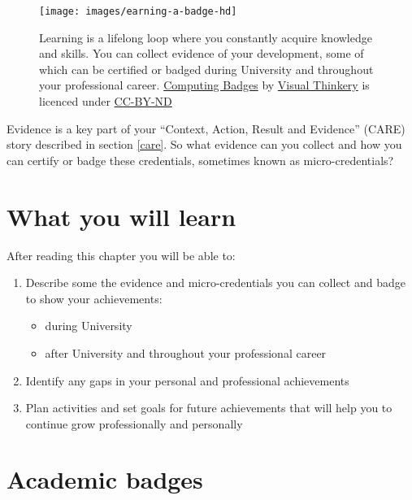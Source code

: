 \documentclass[
]{book}
\providecommand{\tightlist}{%
  \setlength{\itemsep}{0pt}\setlength{\parskip}{0pt}}
\begin{document}
\begin{figure}

{\centering \texttt{[image: images/earning-a-badge-hd]} 

}

\caption{Learning is a lifelong loop where you constantly acquire knowledge and skills. You can collect evidence of your development, some of which can be certified or badged during University and throughout your professional career. \href{https://bryanmmathers.com/computing-badges/}{Computing Badges} by \href{https://visualthinkery.com/}{Visual Thinkery} is licenced under \href{https://creativecommons.org/licenses/by-nd/4.0/}{CC-BY-ND}}\label{fig:while-learning-fig}
\end{figure}



Evidence is a key part of your ``Context, Action, Result and Evidence'' (CARE) story described in section \ref{care}. So what evidence can you collect and how you can certify or badge these credentials, sometimes known as micro-credentials? 📛 \citep{microc}

\hypertarget{ilob}{%
\section{What you will learn}\label{ilob}}

After reading this chapter you will be able to:

\begin{enumerate}
\def\labelenumi{\arabic{enumi}.}
\tightlist
\item
  Describe some the evidence and micro-credentials you can collect and badge to show your achievements:

  \begin{itemize}
  \tightlist
  \item
    during University
  \item
    after University and throughout your professional career
  \end{itemize}
\item
  Identify any gaps in your personal and professional achievements
\item
  Plan activities and set goals for future achievements that will help you to continue grow professionally and personally
\end{enumerate}

\hypertarget{academentia}{%
\section{Academic badges}\label{academentia}}
\end{document}
